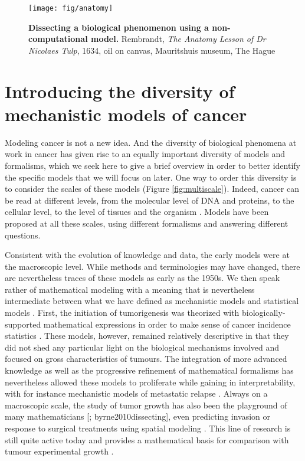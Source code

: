 \documentclass[a4paper,12pt,twoside,onecolumn,openright,final,oldfontcommands]{memoir}
\begin{document}
\begin{figure}

{\centering \texttt{[image: fig/anatomy]} 

}

\caption[Dissecting a biological phenomenon using a non-computational model]{\textbf{Dissecting a biological phenomenon using a
non-computational model.} Rembrandt, \emph{The Anatomy Lesson of Dr
Nicolaes Tulp}, 1634, oil on canvas, Mauritshuis museum, The Hague}\label{fig:anatomy}
\end{figure}





\section{Introducing the diversity of mechanistic models of
cancer}\label{introducing-the-diversity-of-mechanistic-models-of-cancer}

Modeling cancer is not a new idea. And the diversity of biological
phenomena at work in cancer has given rise to an equally important
diversity of models and formalisms, which we seek here to give a brief
overview in order to better identify the specific models that we will
focus on later. One way to order this diversity is to consider the
scales of these models (Figure \ref{fig:multiscale}). Indeed, cancer can
be read at different levels, from the molecular level of DNA and
proteins, to the cellular level, to the level of tissues and the
organism \citep{anderson2008integrative}. Models have been proposed at
all these scales, using different formalisms
\citep{bellomo2008foundations} and answering different questions.

Consistent with the evolution of knowledge and data, the early models
were at the macroscopic level. While methods and terminologies may have
changed, there are nevertheless traces of these models as early as the
1950s. We then speak rather of mathematical modeling with a meaning that
is nevertheless intermediate between what we have defined as mechanistic
models and statistical models \citep{byrne2010dissecting}. First, the
initiation of tumorigenesis was theorized with biologically-supported
mathematical expressions in order to make sense of cancer incidence
statistics \citep[\citet{knudson1971mutation}]{armitage1954age}. These
models, however, remained relatively descriptive in that they did not
shed any particular light on the biological mechanisms involved and
focused on gross characteristics of tumours. The integration of more
advanced knowledge as well as the progressive refinement of mathematical
formalisms has nevertheless allowed these models to proliferate while
gaining in interpretability, with for instance mechanistic models of
metastatic relapse \citep{nicolo2020machine}. Always on a macroscopic
scale, the study of tumor growth has also been the playground of many
mathematicians {[}\citet{araujo2004history}; byrne2010dissecting{]},
even predicting invasion or response to surgical treatments using
spatial modeling \citep{swanson2003virtual}. This line of research is
still quite active today and provides a mathematical basis for
comparison with tumour experimental growth
\citep{benzekry2014classical}.
\end{document}
